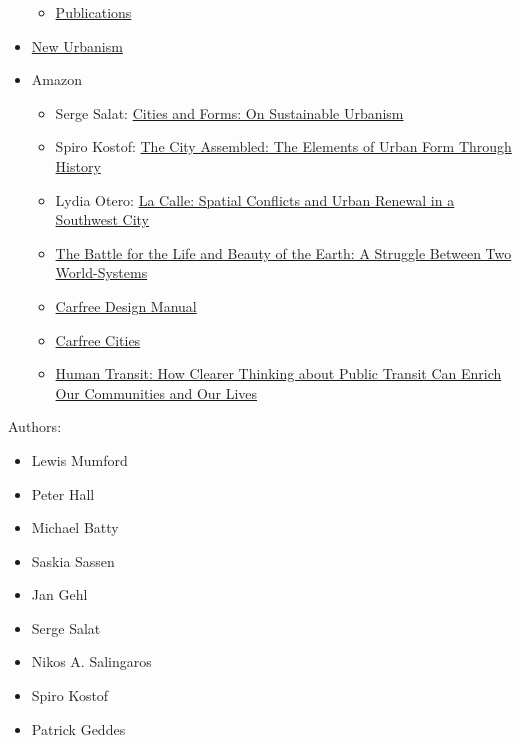 \documentclass[]{article}
\begin{document}
\begin{itemize}
  \begin{itemize}
  \itemsep1pt\parskip0pt
  \item
    \href{http://www.stadtbaukunst.org/english/texts-about-urban-design/index.html}{Publications}
  \end{itemize}
\item
  \href{http://www.newurbanism.org/}{New Urbanism}
\item
  Amazon

  \begin{itemize}
  \itemsep1pt\parskip0pt
  \item
    Serge Salat:
    \href{http://www.amazon.com/Cities-Forms-On-Sustainable-Urbanism/dp/2705681116}{Cities
    and Forms: On Sustainable Urbanism}
  \item
    Spiro Kostof:
    \href{http://www.amazon.com/The-City-Assembled-Elements-Through/dp/0821219308/ref=pd_sim_b_1?ie=UTF8\&refRID=19Z04ZAV2K0Z7784G86A}{The
    City Assembled: The Elements of Urban Form Through History}
  \item
    Lydia Otero:
    \href{http://www.amazon.com/La-Calle-Spatial-Conflicts-Southwest/dp/0816528888/ref=pd_sim_b_4?ie=UTF8\&refRID=0GDA25RHFDPF2QQDMR0C}{La
    Calle: Spatial Conflicts and Urban Renewal in a Southwest City}
  \item
    \href{http://www.amazon.com/Battle-Life-Beauty-Earth-World-Systems/dp/0199898073/ref=la_B000AQ4JVU_1_3?ie=UTF8\&qid=1369782219\&sr=1-3}{The
    Battle for the Life and Beauty of the Earth: A Struggle Between Two
    World-Systems}
  \item
    \href{http://www.amazon.com/Carfree-Design-Manual-J-Crawford/dp/9057270609/ref=pd_sim_b_1?ie=UTF8\&refRID=0R5CVQM8RRWQ5SM5QDM1}{Carfree
    Design Manual}
  \item
    \href{http://www.amazon.com/exec/obidos/ASIN/9057270420/}{Carfree
    Cities}
  \item
    \href{http://www.amazon.com/Human-Transit-Clearer-Thinking-Communities-ebook/dp/B008LVR1KM/ref=tmm_kin_title_0?ie=UTF8\&qid=1402344064\&sr=1-1}{Human
    Transit: How Clearer Thinking about Public Transit Can Enrich Our
    Communities and Our Lives}
  \end{itemize}
\end{itemize}

Authors:

\begin{itemize}
\itemsep1pt\parskip0pt
\item
  Lewis Mumford
\item
  Peter Hall
\item
  Michael Batty
\item
  Saskia Sassen
\item
  Jan Gehl
\item
  Serge Salat
\item
  Nikos A. Salingaros
\item
  Spiro Kostof
\item
  Patrick Geddes
\end{itemize}
\end{document}
